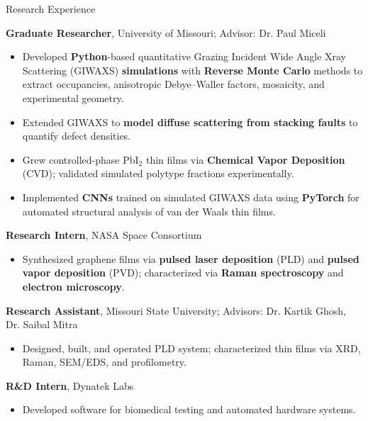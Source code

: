 \begin{rubric}{Research Experience}

    \entry*[2021--Present]%
    \textbf{Graduate Researcher}, University of Missouri; Advisor: Dr. Paul Miceli
    \begin{itemize}
        \item Developed \textbf{Python}-based quantitative Grazing Incident Wide Angle Xray Scattering (GIWAXS) \textbf{simulations} with \textbf{Reverse Monte Carlo} methods to extract occupancies, anisotropic Debye--Waller factors, mosaicity, and experimental geometry.
        \item Extended GIWAXS to \textbf{model diffuse scattering from stacking faults} to quantify defect densities.
        \item Grew controlled-phase PbI$_2$ thin films via \textbf{Chemical Vapor Deposition} (CVD); validated simulated polytype fractions experimentally.
        \item Implemented \textbf{CNNs} trained on simulated GIWAXS data using \textbf{PyTorch} for automated structural analysis of van der Waals thin films.
    \end{itemize}

    \entry*[2019--2020]%
    \textbf{Research Intern}, NASA Space Consortium
    \begin{itemize}
        \item Synthesized graphene films via \textbf{pulsed laser deposition} (PLD) and \textbf{pulsed vapor deposition} (PVD); characterized via \textbf{Raman spectroscopy} and \textbf{electron microscopy}.
    \end{itemize}

    \entry*[2017--2020]%
    \textbf{Research Assistant}, Missouri State University; Advisors: Dr. Kartik Ghosh, Dr. Saibal Mitra
    \begin{itemize}
        \item Designed, built, and operated PLD system; characterized thin films via XRD, Raman, SEM/EDS, and profilometry.
    \end{itemize}

    \entry*[2019]%
    \textbf{R\&D Intern}, Dynatek Labs
    \begin{itemize}
        \item Developed software for biomedical testing and automated hardware systems.
    \end{itemize}

\end{rubric}
